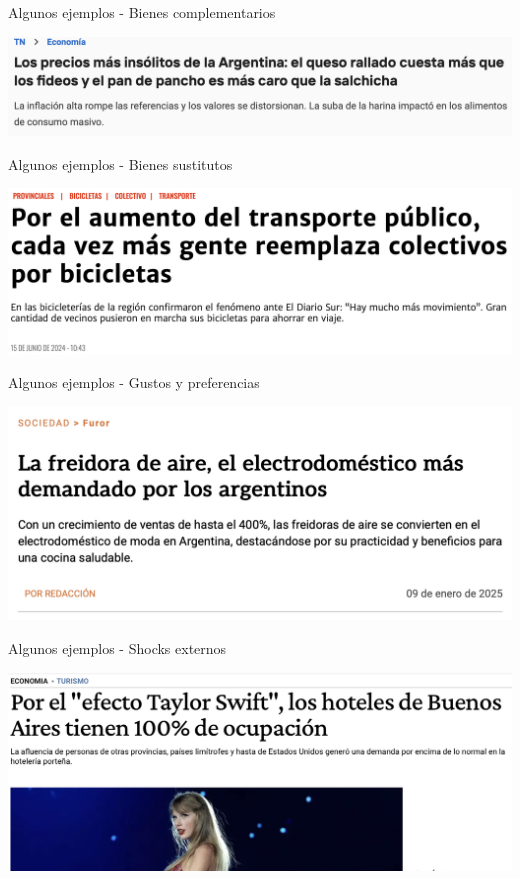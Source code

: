 \documentclass{beamer}
\begin{document}
\begin{frame}{Algunos ejemplos - Bienes complementarios}
    \begin{center}
        \includegraphics[scale=0.24]{../Figures/M4.1.png}
    \end{center}
\end{frame}

\begin{frame}{Algunos ejemplos - Bienes sustitutos}
    \begin{center}
        \includegraphics[scale=0.3]{../Figures/M4.2.png}
    \end{center}
\end{frame}

\begin{frame}{Algunos ejemplos - Gustos y preferencias}
    \begin{center}
        \includegraphics[scale=0.45]{../Figures/M4.3.png}
    \end{center}
\end{frame}

\begin{frame}{Algunos ejemplos - Shocks externos}
    \begin{center}
        \includegraphics[scale=0.55]{../Figures/M4.5.png}
    \end{center}
\end{frame}
\end{document}
